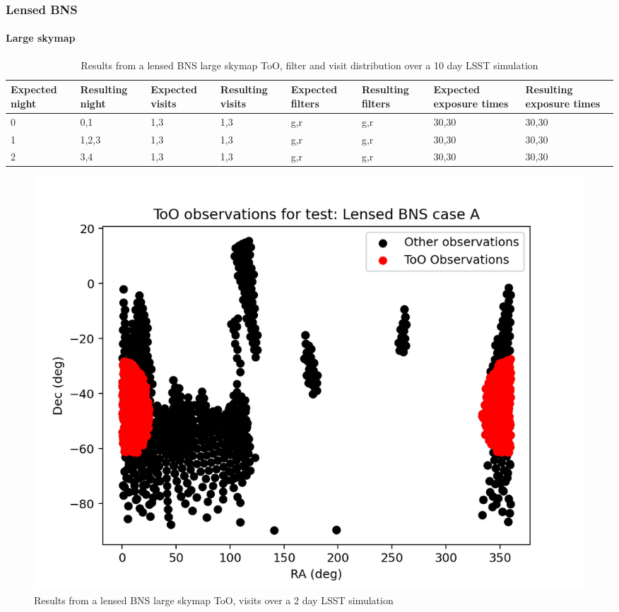 \subsubsection{Lensed BNS}

\paragraph{Large skymap}

\begin{table}[]
\centering
\begin{adjustbox}{max width=\linewidth}
\begin{tabular}{|l|l|l|l|l|l|l|l|}
\hline
Expected night & Resulting night & Expected visits & Resulting visits & Expected filters & Resulting filters & Expected exposure times & Resulting exposure times \\ \hline
0              & 0,1             & 1,3             & 1,3              & g,r              & g,r               & 30,30                   & 30,30                    \\ \hline
1              & 1,2,3           & 1,3             & 1,3              & g,r              & g,r               & 30,30                   & 30,30                    \\ \hline
2              & 3,4             & 1,3             & 1,3              & g,r              & g,r               & 30,30                   & 30,30                    \\ \hline
\end{tabular}
\end{adjustbox}
\caption{Results from a lensed BNS large skymap ToO, filter and visit distribution over a 10 day LSST simulation}
\label{tab:LensedBNSAResults}
\end{table}


\begin{figure}
    \centering
    \includegraphics[width=\linewidth]{figures/validationTests/SVRequired/LensedBNSAPosition.png}
    \caption{Results from a lensed BNS large skymap ToO, visits over a 2 day LSST simulation}
    \label{fig:LensedBNSAPositionResult}
\end{figure}

